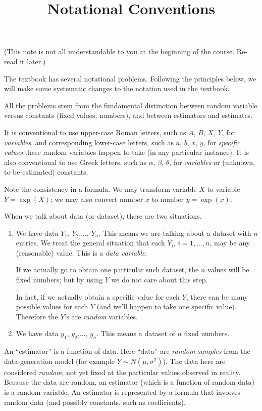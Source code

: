 \documentclass[12pt]{article}
\begin{document}
\title{Notational Conventions}
\maketitle

(This note is not all understandable to you at the beginning of the
course. Re-read it later.)

The textbook has several notational problems.
Following the principles below,
we will make some systematic changes to the notation used in the
textbook.

All the problems stem from the fundamental distinction between
random variable versus constants (fixed values, numbers),
and between estimators and estimates.

It is conventional to use upper-case Roman letters,
such as $A$, $B$, $X$, $Y$,
for \emph{variables},
and corresponding lower-case letters,
such as $a$, $b$, $x$, $y$,
for \emph{specific values} these random variables happen to take
(in any particular instance).
It is also conventional to use Greek letters,
such as $\alpha$, $\beta$, $\theta$,
for \emph{variables} or (unknown, to-be-estimated) constants.

Note the consistency in a formula.
We may transform variable $X$ to
variable $Y = \exp(X)$;
we may also convert number $x$ to
number $y = \exp(x)$.

When we talk about data (or dataset), there are two situations.
\begin{enumerate}
\item
We have data $Y_1$, $Y_2$,..., $Y_n$.
This means we are talking about a dataset with $n$ entries.
We treat the general situation that each $Y_i$, $i=1,\dotsc,n$,
may be any (reasonable) value.
This is a \emph{data variable}.

If we actually go to obtain one particular such dataset,
the $n$ values will be fixed numbers; but by using $Y$ we do not care about
this step.

In fact, if we actually obtain a specific value for each $Y$,
there can be many possible values for each $Y$ (and we'll happen to take
one specific value). Therefore the $Y$'s are \emph{random} variables.

\item
We have data $y_1$, $y_2$,..., $y_n$.
This means a dataset of $n$ fixed numbers.
\end{enumerate}

An ``estimator'' is a function of data.
Here ``data'' are \emph{random samples} from the data-generation model
(for example $Y \sim N(\mu, \sigma^2)$).
The data here are considered \emph{random}, not yet fixed at the
particular values observed in reality.
Because the data are random, an estimator (which is a function of random
data) is a random variable.
An estimator is represented by a formula that involves random data (and
possibly constants, such as coefficients).
\end{document}
